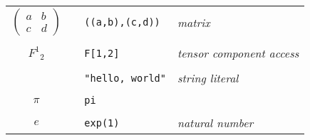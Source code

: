 \begin{center}
\begin{tabular}{clll}
$\begin{pmatrix}a&b\\ c&d\end{pmatrix}$ & & {\tt ((a,b),(c,d))} & {\it matrix} \\
\\
$F^1{}_2$ & & {\tt F[1,2]} & {\it tensor component access} \\
\\
 & & \verb$"hello, world"$ & {\it string literal} \\
\\
$\pi$ & & {\tt pi} & \\
\\
$e$ && {\tt exp(1)} & {\it natural number}
\end{tabular}
\end{center}
